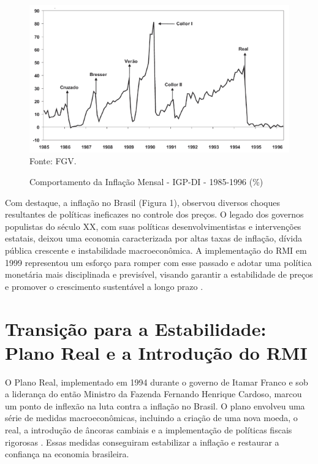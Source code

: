 \documentclass[12pt,oneside,a4paper,chapter=TITLE,english,brazil,sumario=abnt-6027-2012]{abntex2}
\begin{document}
\begin{figure}[H]
	
	\caption{Comportamento da Inflação Mensal - IGP-DI - 1985-1996 (\%)}
	
	\includegraphics[]{igp-di.png}\\
	
	\footnotesize Fonte: FGV.
	
\end{figure}

Com destaque, a inflação no Brasil (Figura 1), observou diversos choques resultantes de políticas ineficazes no controle dos preços. O legado dos governos populistas do século XX, com suas políticas desenvolvimentistas e intervenções estatais, deixou uma economia caracterizada por altas taxas de inflação, dívida pública crescente e instabilidade macroeconômica. A implementação do RMI em 1999 representou um esforço para romper com esse passado e adotar uma política monetária mais disciplinada e previsível, visando garantir a estabilidade de preços e promover o crescimento sustentável a longo prazo \cite{amaurypatrickgremaud_2009_economia}.

\section{Transição para a Estabilidade: Plano Real e a Introdução do RMI}

O Plano Real, implementado em 1994 durante o governo de Itamar Franco e sob a liderança do então Ministro da Fazenda Fernando Henrique Cardoso, marcou um ponto de inflexão na luta contra a inflação no Brasil. O plano envolveu uma série de medidas macroeconômicas, incluindo a criação de uma nova moeda, o real, a introdução de âncoras cambiais e a implementação de políticas fiscais rigorosas \cite{amaurypatrickgremaud_2009_economia}. Essas medidas conseguiram estabilizar a inflação e restaurar a confiança na economia brasileira.
\end{document}
